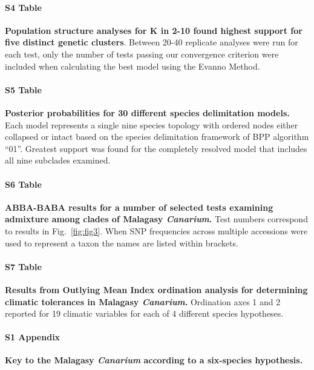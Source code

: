 \documentclass[10pt,letterpaper]{article}
\begin{document}
\paragraph*{S4 Table}
\label{supptab:4}
{\bf Population structure analyses for K in 2-10 found highest support for five distinct genetic clusters}.
Between 20-40 replicate analyses were run for each test, only the number of tests passing our convergence
criterion were included when calculating the best model using the Evanno Method. 

\paragraph*{S5 Table}
\label{supptab:5}
{\bf Posterior probabilities for 30 different species delimitation models.}
Each model represents a single nine species topology with ordered nodes either collapsed or
intact based on the species delimitation framework of BPP algorithm ``01''.
Greatest support was found for the completely resolved model that includes all nine
subclades examined.


\paragraph*{S6 Table}
\label{supptab:6}
{\bf ABBA-BABA results for a number of selected tests examining admixture among clades of Malagasy \emph{Canarium}.}
Test numbers correspond to results in Fig.~\ref{fig:fig3}. When SNP frequencies across multiple
accessions were used to represent a taxon the names are listed within brackets.


\paragraph*{S7 Table}
\label{supptab:7}
{\bf Results from Outlying Mean Index ordination analysis for determining climatic tolerances in Malagasy \emph{Canarium}.}
Ordination axes 1 and 2 reported for 19 climatic variables for each of 4 different
species hypotheses.


\paragraph*{S1 Appendix}
\label{suppappendix:1}
{\bf Key to the Malagasy \emph{Canarium} according to a six-species hypothesis.}
\end{document}
